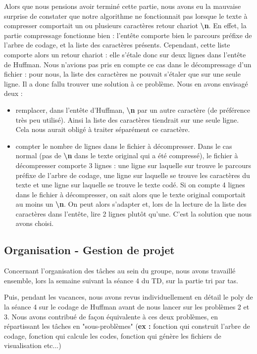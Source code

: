 \documentclass[11pt]{article}
\begin{document}
Alors que nous pensions avoir terminé cette partie, nous avons eu la mauvaise surprise de constater que notre algorithme ne fonctionnait pas lorsque le texte à compresser comportait un ou plusieurs caractères retour chariot \textbf{\textbackslash n}. En effet, la partie compressage fonctionne bien : l'entête comporte bien le parcours préfixe de l'arbre de codage, et la liste des caractères présents. Cependant, cette liste comporte alors un retour chariot : elle s'étale donc sur deux lignes dans l'entête de Huffman. Nous n'avions pas pris en compte ce cas dans le décompressage d'un fichier : pour nous, la liste des caractères ne pouvait s'étaler que sur une seule ligne.
Il a donc fallu trouver une solution à ce problème. Nous en avons envisagé deux :
\begin{itemize}
\item remplacer, dans l'entête d'Huffman, \textbf{\textbackslash n} par un autre caractère (de préférence très peu utilisé). Ainsi la liste des caractères tiendrait sur une seule ligne. Cela nous aurait obligé à traiter séparément ce caractère.
\item compter le nombre de lignes dans le fichier à décompresser. Dans le cas normal (pas de \textbf{\textbackslash n} dans le texte original qui a été compressé), le fichier à décompresser comporte 3 lignes : une ligne sur laquelle sur trouve le parcours préfixe de l'arbre de codage, une ligne sur laquelle se trouve les caractères du texte et une ligne sur laquelle se trouve le texte codé. Si on compte 4 lignes dans le fichier à décompresser, on sait alors que le texte original comportait au moins un \textbf{\textbackslash n}. On peut alors s'adapter et, lors de la lecture de la liste des caractères dans l'entête, lire 2 lignes plutôt qu'une. C'est la solution que nous avons choisi.
\end{itemize}


\subsection{Organisation - Gestion de projet}

Concernant l'organisation des tâches au sein du groupe, nous avons travaillé ensemble, lors la semaine suivant la séance 4 du TD, sur la partie tri par tas.

Puis, pendant les vacances, nous avons revus individuellement en détail le poly de la séance 4 sur le codage de Huffman avant de nous lancer sur les problèmes 2 et 3. Nous avons contribué de façon équivalente à ces deux problèmes, en répartissant les tâches en "sous-problèmes" (\textbf{ex :} fonction qui construit l'arbre de codage, fonction qui calcule les codes, fonction qui génère les fichiers de visualisation etc...)
\end{document}
